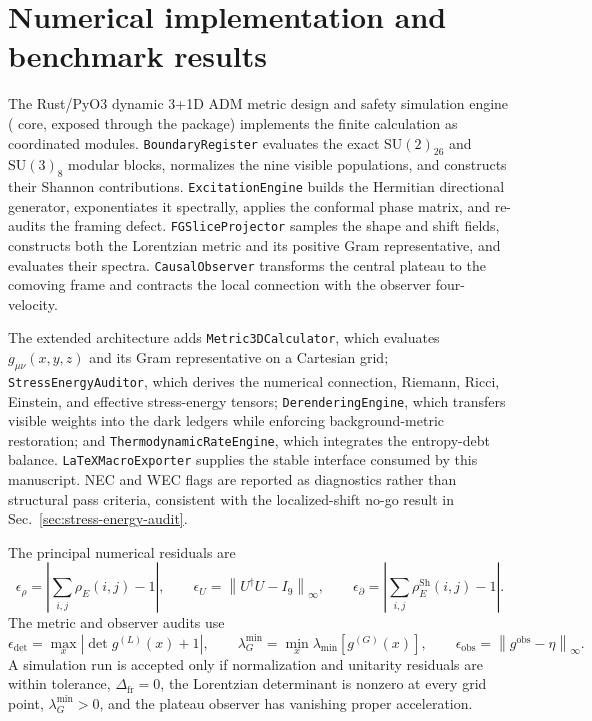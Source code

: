 \section{Numerical implementation and benchmark results}\label{sec:numerical-benchmarks}

The Rust/PyO3 dynamic 3+1D ADM metric design and safety simulation engine
( core, exposed through the  package)
implements the finite calculation as coordinated modules.  \texttt{Boundary\allowbreak{}Register} evaluates
the exact \(\mathrm{SU}(2)_{26}\) and \(\mathrm{SU}(3)_8\) modular blocks,
normalizes the nine visible populations, and constructs their Shannon
contributions.  \texttt{Excitation\allowbreak{}Engine} builds the Hermitian directional
generator, exponentiates it spectrally, applies the conformal phase matrix,
and re-audits the framing defect.  \texttt{FGSlice\allowbreak{}Projector} samples the shape
and shift fields, constructs both the Lorentzian metric and its positive Gram
representative, and evaluates their spectra.  \texttt{Causal\allowbreak{}Observer}
transforms the central plateau to the comoving frame and contracts the local
connection with the observer four-velocity.

The extended architecture adds \texttt{Metric3D\allowbreak{}Calculator}, which evaluates
\(g_{\mu\nu}(x,y,z)\) and its Gram representative on a Cartesian grid;
\texttt{StressEnergy\allowbreak{}Auditor}, which derives the numerical connection,
Riemann, Ricci, Einstein, and effective stress-energy tensors;
\texttt{Derendering\allowbreak{}Engine}, which transfers visible weights into the dark
ledgers while enforcing background-metric restoration; and
\texttt{ThermodynamicRate\allowbreak{}Engine}, which integrates the entropy-debt balance.
\texttt{LaTeXMacro\allowbreak{}Exporter} supplies the stable interface consumed by this
manuscript.  NEC and WEC flags are reported as diagnostics rather than
structural pass criteria, consistent with the localized-shift no-go result in
Sec.~\ref{sec:stress-energy-audit}.

The principal numerical residuals are
\begin{equation}
  \epsilon_{\rho}
  =\left|\sum_{i,j}\rho_E(i,j)-1\right|,
  \qquad
  \epsilon_U
  =\left\|U^{\dagger}U-I_9\right\|_{\infty},
  \qquad
  \epsilon_{\partial}
  =\left|\sum_{i,j}\rho_E^{\mathrm{Sh}}(i,j)-1\right|.
  \label{eq:numerical-boundary-residuals}
\end{equation}
The metric and observer audits use
\begin{equation}
  \epsilon_{\det}
  =\max_x|\det g^{(L)}(x)+1|,
  \qquad
  \lambda_G^{\min}
  =\min_x\lambda_{\min}[g^{(G)}(x)],
  \qquad
  \epsilon_{\mathrm{obs}}
  =\left\|g^{\mathrm{obs}}-\eta\right\|_{\infty}.
  \label{eq:numerical-metric-residuals}
\end{equation}
A simulation run is accepted only if normalization and unitarity residuals are
within tolerance, \(\Delta_{\mathrm{fr}}=0\), the Lorentzian determinant is
nonzero at every grid point, \(\lambda_G^{\min}>0\), and the plateau observer
has vanishing proper acceleration.

